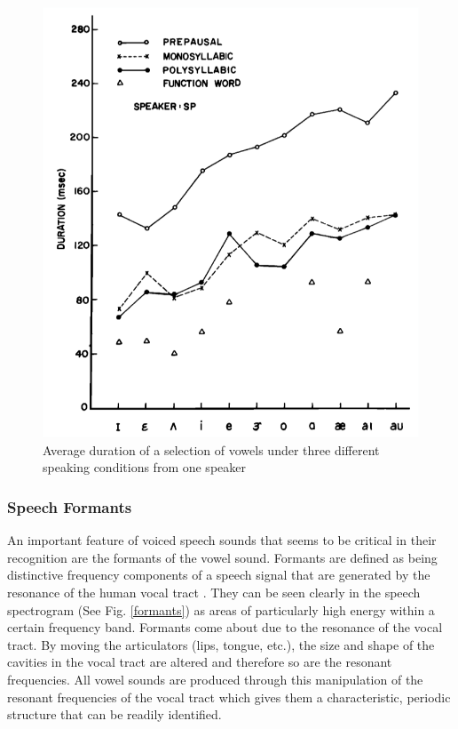 \documentclass[titlepage]{article}
\begin{document}
    \begin{figure}
      \centering
      \includegraphics[scale=0.3]{vowelDuration}
      \caption{Average duration of a selection of vowels under three different
      speaking conditions from one speaker \cite{Umeda1975}}
      \label{vowelDuration}
    \end{figure}

  \subsubsection{Speech Formants}

    An important feature of voiced speech sounds that seems to be critical in their
    recognition are the formants of the vowel sound. Formants are defined as being distinctive
    frequency components of a speech signal that are generated by the resonance
    of the human vocal tract \cite{Denes1993}. They can be seen clearly in the speech spectrogram
    (See Fig. \ref{formants}) as areas of particularly high energy within a certain frequency band.
    Formants come about due to the resonance of the vocal tract. By moving the articulators
    (lips, tongue, etc.), the size and shape of the cavities in the vocal tract are altered and
    therefore so are the resonant frequencies. All vowel sounds are produced through this manipulation
    of the resonant frequencies of the vocal tract which gives them a characteristic, periodic
    structure that can be readily identified.
\end{document}
